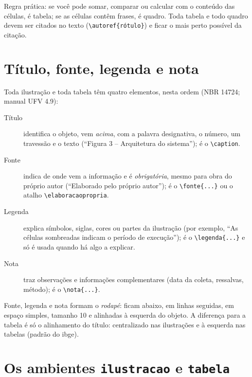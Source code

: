 Regra prática: se você pode somar, comparar ou calcular com o conteúdo das células,
é tabela; se as células contêm frases, é quadro. Toda tabela e todo quadro devem ser
citados no texto (\texttt{\textbackslash autoref\{rótulo\}}) e ficar o mais perto possível
da citação.

\section{Título, fonte, legenda e nota}

Toda ilustração e toda tabela têm quatro elementos, nesta ordem (NBR 14724; manual UFV 4.9):
\begin{description}
  \item[Título] identifica o objeto, vem \emph{acima}, com a palavra designativa, o número,
        um travessão e o texto (``Figura 3 -- Arquitetura do sistema''); é o
        \texttt{\textbackslash caption}.
  \item[Fonte] indica de onde vem a informação e é \emph{obrigatória}, mesmo para obra do
        próprio autor (``Elaborado pelo próprio autor''); é o \texttt{\textbackslash fonte\{...\}}
        ou o atalho \texttt{\textbackslash elaboracaopropria}.
  \item[Legenda] explica símbolos, siglas, cores ou partes da ilustração (por exemplo,
        ``As células sombreadas indicam o período de execução''); é o \texttt{\textbackslash legenda\{...\}}
        e só é usada quando há algo a explicar.
  \item[Nota] traz observações e informações complementares (data da coleta, ressalvas,
        método); é o \texttt{\textbackslash nota\{...\}}.
\end{description}
Fonte, legenda e nota formam o \emph{rodapé}: ficam abaixo, em linhas seguidas, em espaço
simples, tamanho 10 e alinhadas à esquerda do objeto. A diferença para a tabela é só
o alinhamento do título: centralizado nas ilustrações e à esquerda nas tabelas (padrão do
\ac{ibge}).

\section{Os ambientes \texttt{ilustracao} e \texttt{tabela}}

